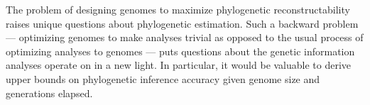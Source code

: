 The problem of designing genomes to maximize phylogenetic reconstructability raises unique questions about phylogenetic estimation.
Such a backward problem --- optimizing genomes to make analyses trivial as opposed to the usual process of optimizing analyses to genomes --- puts questions about the genetic information analyses operate on in a new light.
In particular, it would be valuable to derive upper bounds on phylogenetic inference accuracy given genome size and generations elapsed.
